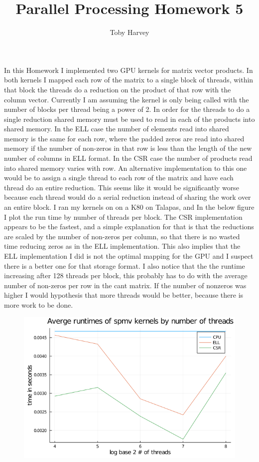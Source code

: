 \documentclass{article}
\begin{document}
\title{Parallel Processing Homework 5}
\author{Toby Harvey}
\maketitle

\noindent In this Homework I implemented two GPU kernels for matrix vector products. In both kernels I mapped each row of the matrix to a single block of threads, within that block the threads do a reduction on the product of that row with the column vector. Currently I am assuming the kernel is only being called with the number of blocks per thread being a power of 2. In order for the threads to do a single reduction shared memory must be used to read in each of the products into shared memory. In the ELL case the number of elements read into shared memory is the same for each row, where the padded zeros are read into shared memory if the number of non-zeros in that row is less than the length of the new number of columns in ELL format. In the CSR case the number of products read into shared memory varies with row. An alternative implementation to this one  would be to assign a single thread to each row of the matrix and have each thread do an entire reduction. This seems like it would be significantly worse because each thread would do a serial reduction instead of sharing the work over an entire block. I ran my kernels on on a K80 on Talapas, and In the below figure I plot the run time by number of threads per block. The CSR implementation appears to be the fastest, and a simple explanation for that is that the reductions are scaled by the number of non-zeros per column, so that there is no wasted time reducing zeros as in the ELL implementation. This also implies that the ELL implementation I did is not the optimal mapping for the GPU and I suspect there is a better one for that storage format. I also notice that the the runtime increasing after 128 threads per block, this probably has to do with the average number of non-zeros per row in the cant matrix. If the number of nonzeros was higher I would hypothesis that more threads would be better, because there is more work to be done. 

\begin{figure}
  \includegraphics[scale=.5]{thread_runtime.png}
\end{figure}
\end{document}
